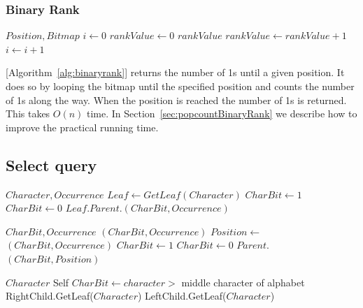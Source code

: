 \subsubsection{Binary Rank} 
\label{sec:TheoryBinaryRank}
\begin{algorithm}
\caption{BinaryRank}
\label{alg:binaryrank}
\begin{algorithmic}
 {$Position, Bitmap$}
	\State $i \gets 0$
	\State $rankValue \gets 0$
			\State \Return $rankValue$
		\EndIf
			\State $rankValue \gets rankValue + 1$
		\EndIf
		\State $i \gets i + 1$
	\EndFor
\EndFunction
\end{algorithmic}
\end{algorithm}

 [Algorithm~\ref{alg:binaryrank}] returns the number of 1s until a given position.
It does so by looping the bitmap until the specified position and counts the number of 1s along the way.
When the position is reached the number of 1s is returned.
This takes $O(n)$ time.
In Section~\ref{sec:popcountBinaryRank} we describe how to improve the practical running time.


\subsection{Select query}
\begin{algorithm}
\caption{Select}
\label{alg:select}
\begin{algorithmic} 
 {$Character, Occurrence$}
\State $Leaf \gets GetLeaf(Character)$
	\State $CharBit \gets 1$
\Else
	\State $CharBit \gets 0$
\EndIf
\State \Return $Leaf.Parent.$$(CharBit, Occurrence)$
\EndFunction

\vspace{1cm}

 {$CharBit, Occurrence$}
	\State \Return {}$(CharBit, Occurrence)$
\EndIf
\State $Position \gets $$(CharBit, Occurrence)$
	\State $CharBit \gets 1$
\Else
	\State $CharBit \gets 0$
\EndIf
\State \Return $Parent.$$(CharBit, Position)$
\EndFunction

\vspace{1cm}

 {$Character$}
	\State \Return Self
\EndIf
\State $CharBit \gets character >$ middle character of alphabet
	\State \Return RightChild.GetLeaf($Character$)
	\State \Return LeftChild.GetLeaf($Character$)
\EndIf
\EndFunction
\end{algorithmic}
\end{algorithm}


